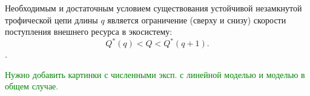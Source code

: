        \begin{corollary}
            Необходимым и достаточным условием существования устойчивой незамкнутой трофической цепи длины \(q\) является ограничение (сверху и снизу) скорости поступления внешнего ресурса в экосистему:
            \begin{equation}
                Q^*(q) < Q < Q^*(q+1).
            \end{equation}.
        \end{corollary}
        
        \textcolor{green}{Нужно добавить картинки с численными эксп. с линейной моделью и моделью в общем случае.}


